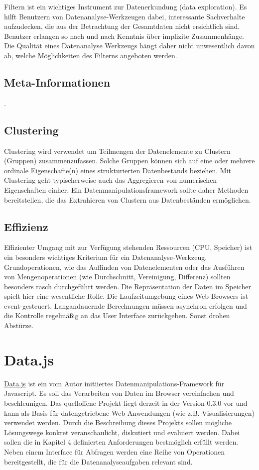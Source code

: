 \documentclass[runningheads]{llncs}
\begin{document}
Filtern ist ein wichtiges Instrument zur Datenerkundung (data exploration). Es hilft Benutzern von Datenanalyse-Werkzeugen dabei, interessante Sachverhalte aufzudecken, die aus der Betrachtung der Gesamtdaten nicht ersichtlich sind. Benutzer erlangen so nach und nach Kenntnis über implizite Zusammenhänge. Die Qualität eines Datenanalyse Werkzeugs hängt daher nicht unwesentlich davon ab, welche Möglichkeiten des Filterns angeboten werden.

\subsection{Meta-Informationen}
.

\subsection{Clustering}


Clustering wird verwendet um Teilmengen der Datenelemente zu Clustern (Gruppen) zusammenzufassen. Solche Gruppen können sich auf eine oder mehrere ordinale Eigenschafte(n) eines strukturierten Datenbestands beziehen. Mit Clustering geht typischerweise auch das Aggregieren von numerischen Eigenschaften einher. Ein Datenmanipulationsframework sollte daher Methoden bereitstellen, die das Extrahieren von Clustern aus Datenbeständen ermöglichen.

\subsection{Effizienz}


Effizienter Umgang mit zur Verfügung stehenden Ressourcen (CPU, Speicher) ist ein besonders wichtiges Kriterium für ein Datenanalyse-Werkzeug. Grundoperationen, wie das Auffinden von Datenelementen oder das Ausführen von Mengenoperationen (wie Durchschnitt, Vereinigung, Differenz) sollten besonders rasch durchgeführt werden. Die Repräsentation der Daten im Speicher spielt hier eine wesentliche Rolle. Die Laufzeitumgebung eines Web-Browsers ist event-gesteuert. Langandauernde Berechnungen müssen asynchron erfolgen und die Kontrolle regelmäßig an das User Interface zurückgeben. Sonst drohen Abstürze.

\section{Data.js}


 \href{http://substance.io/#michael/data-js}{Data.js} ist ein vom Autor initiiertes Datenmanipulations-Framework für Javascript. Es soll das Verarbeiten von Daten im Browser vereinfachen und beschleunigen. Das quelloffene Projekt liegt derzeit in der Version 0.3.0 vor und kann als Basis für datengetriebene Web-Anwendungen (wie z.B. Visualisierungen) verwendet werden. Durch die Beschreibung dieses Projekts sollen mögliche Lösungswege konkret veranschaulicht, diskutiert und evaluiert werden.  Dabei sollen die in Kapitel 4 definierten Anforderungen bestmöglich erfüllt werden. Neben einem Interface für Abfragen werden eine Reihe von Operationen bereitgestellt, die für die Datenanalyseaufgaben relevant sind.
\end{document}
